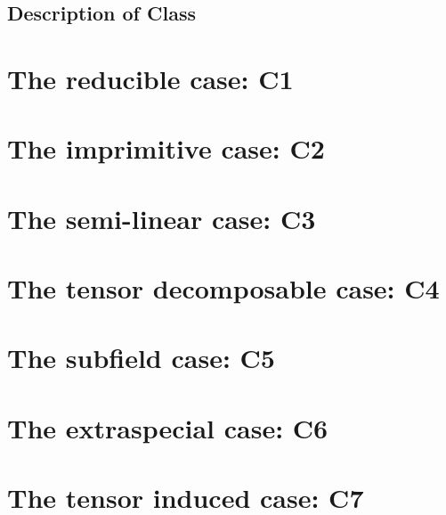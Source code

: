 \subsection{Description of Class }
\label{descC9}

\section{The reducible case: C1}
\label{solveC1}

\section{The imprimitive case: C2}
\label{solveC2}

\section{The semi-linear case: C3}
\label{solveC3}

\section{The tensor decomposable case: C4}
\label{solveC4}

\section{The subfield case: C5}
\label{solveC5}

\section{The extraspecial case: C6}
\label{solveC6}

\section{The tensor induced case: C7}
\label{solveC7}



